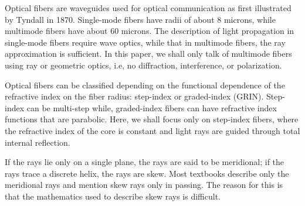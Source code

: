 \documentclass[a4paper,twocolumn,superscriptaddress]{revtex4-1}
\begin{document}






Optical fibers are waveguides used for optical communication as first illustrated by Tyndall in 1870\cite{Kapany}. 
Single-mode fibers have radii of about 8 microns, while multimode fibers have about 60 microns\cite{opticalswitching}. 
The description of light propagation in single-mode fibers require wave optics, while that in multimode fibers, the ray approximation is sufficient.\cite{lovesnyder} 
In this paper, we shall only talk of multimode fibers using ray or geometric optics, i.e, no diffraction, interference, or polarization.

Optical fibers can be classified depending on the functional dependence of the refractive index on the fiber radius: step-index or graded-index (GRIN). 
Step-index can be multi-step\cite{zubia} while, graded-index fibers can have refractive index functions that are parabolic. 
Here, we shall focus only on step-index fibers, where the refractive index of the core is constant and light rays are guided through total internal reflection. 

If the rays lie only on a single plane, the rays are said to be meridional; if the rays trace a discrete helix, the rays are skew.
Most textbooks describe only the meridional rays and mention skew rays only in passing. 
The reason for this is that the mathematics used to describe skew rays is difficult. 
\cite{leviBook,handbook,iizukaBook}
\end{document}

